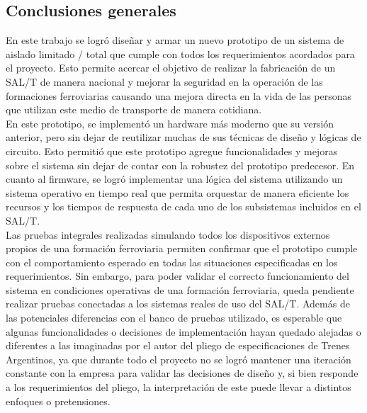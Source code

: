 \subsection{Conclusiones generales}

En este trabajo se logró diseñar y armar un nuevo prototipo de un sistema de aislado limitado / total que cumple con todos los requerimientos acordados para el proyecto. Esto permite acercar el objetivo de realizar la fabricación de un SAL/T de manera nacional y mejorar la seguridad en la operación de las formaciones ferroviarias causando una mejora directa en la vida de las personas que utilizan este medio de transporte de manera cotidiana. \\

En este prototipo, se implementó un hardware más moderno que su versión anterior, pero sin dejar de reutilizar muchas de sus técnicas de diseño y lógicas de circuito. Esto permitió que este prototipo agregue funcionalidades y mejoras sobre el sistema sin dejar de contar con la robustez del prototipo predecesor. En cuanto al firmware, se logró implementar una lógica del sistema utilizando un sistema operativo en tiempo real que permita orquestar de manera eficiente los recursos y los tiempos de respuesta de cada uno de los subsistemas incluidos en el SAL/T. \\ 

Las pruebas integrales realizadas simulando todos los dispositivos externos propios de una formación ferroviaria permiten confirmar que el prototipo cumple con el comportamiento esperado en todas las situaciones especificadas en los requerimientos. Sin embargo, para poder validar el correcto funcionamiento del sistema en condiciones operativas de una formación ferroviaria, queda pendiente realizar pruebas conectadas a los sistemas reales de uso del SAL/T. Además de las potenciales diferencias con el banco de pruebas utilizado, es esperable que algunas funcionalidades o decisiones de implementación hayan quedado alejadas o diferentes a las imaginadas por el autor del pliego de especificaciones de Trenes Argentinos, ya que durante todo el proyecto no se logró mantener una iteración constante con la empresa para validar las decisiones de diseño y, si bien responde a los requerimientos del pliego, la interpretación de este puede llevar a distintos enfoques o pretensiones. \\ 

